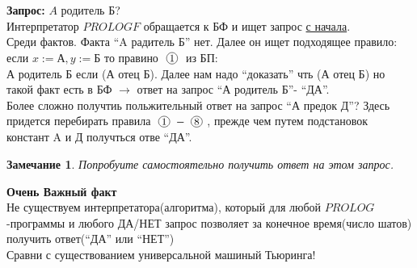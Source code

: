 \documentclass{article}
\newcommand*{\circled}[1]{\lower.7ex\hbox{\tikz\draw (0pt, 0pt)%
		circle (.5em) node {\makebox[1em][c]{\small #1}};}}
\newtheorem{Remark}{Замечание}
\numberwithin{example}{section}
\numberwithin{question}{section}
\numberwithin{Remark}{section}
\numberwithin{theorem}{section}
\numberwithin{definition}{section}
\numberwithin{proposition}{section}
\begin{document}
\textbf{Запрос:} $A$ родитель $Б$?\\
Интерпретатор $PROLOGF$ обращается к БФ и ищет запрос \underline{с начала}.\\
Среди фактов. Факта ``A радитель Б'' нет. Далее он ищет подходящее правило:\\
если $x:=\text{А}, y:=\text{Б}$ то правино $\circled{1}$ из БП:\\
А родитель Б если (А отец Б). Далее нам надо ``доказать'' чть (А отец Б) но такой факт есть в БФ $\rightarrow$ ответ на запрос ``А родитель Б''- ``ДА''.\\
Более сложно получтиь польжительный ответ на запрос ``А предок Д''? Здесь придется перебирать правила $\circled{1}-\circled{8}$, прежде чем путем подстановок констант A и Д получться отве ``ДА''.
\begin{Remark}
	Попробуите самостоятельно получить ответ на этом запрос.
\end{Remark}
\textbf{Очень Важный факт}\\
Не существуем интерпретатора(алгоритма), который для любой $PROLOG$-программы и любого ДА/НЕТ запрос позволяет за конечное время(число шатов) получить ответ(``ДА'' или ``НЕТ'')\\
Сравни с существованием универсальной машиный Тьюринга!
\end{document}
